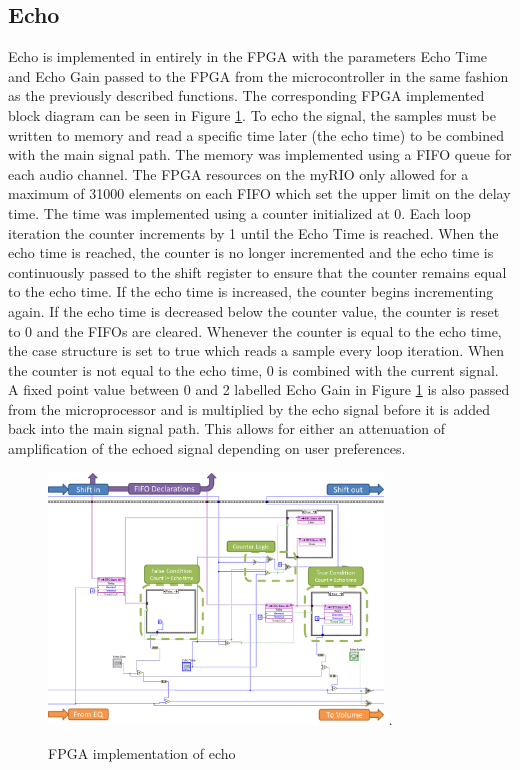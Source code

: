 \subsection{Echo}
Echo is implemented in entirely in the FPGA with the parameters Echo Time and Echo Gain passed to the FPGA from the microcontroller in the same fashion as the previously described functions. 
The corresponding FPGA implemented block diagram can be seen in Figure \ref{fig_echo}.
To echo the signal, the samples must be written to memory and read a specific time later (the echo time) to be combined with the main signal path. 
The memory was implemented using a FIFO queue for each audio channel. The FPGA resources on the myRIO only allowed for a maximum of 31000 elements on each FIFO which set the upper limit on the delay time. 
The time was implemented using a counter initialized at 0. Each loop iteration the counter increments by 1 until the Echo Time is reached. 
When the echo time is reached, the counter is no longer incremented and the echo time is continuously passed to the shift register to ensure that the counter remains equal to the echo time.
If the echo time is increased, the counter begins incrementing again. If the echo time is decreased below the counter value, the counter is reset to 0 and the FIFOs are cleared. 
Whenever the counter is equal to the echo time, the case structure is set to true which reads a sample every loop iteration. 
When the counter is not equal to the echo time, 0 is combined with the current signal. 
A fixed point value between 0 and 2 labelled Echo Gain in Figure \ref{fig_echo} is also passed from the microprocessor and is multiplied by the echo signal before it is added back into the main signal path. 
This allows for either an attenuation of amplification of the echoed signal depending on user preferences.  

\begin{figure}[!t]
\centering
\includegraphics[width=3.5in]{echo.png}
\DeclareGraphicsExtensions.
\caption{FPGA implementation of echo}
\label{fig_echo}
\end{figure} 

